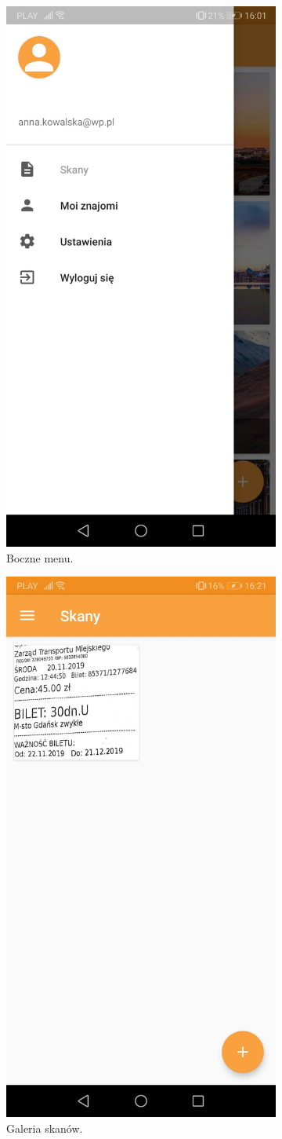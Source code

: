 \documentclass[10pt,twoside,a4paper]{report}
\begin{document}
\begin{figure}[h]
\begin{subfigure}{0.5\textwidth}
\centering
\includegraphics[width=0.9\linewidth, width=5cm]{sideBar}
\caption{Boczne menu.}
\label{fig:sideBar}
\end{subfigure}
\begin{subfigure}{0.5\textwidth}
\centering
\includegraphics[width=0.9\linewidth, width=5cm]{scans}
\caption{Galeria skanów.}
\label{fig:scans}
\end{subfigure}
\begin{subfigure}{0.5\textwidth}
\centering

\end{subfigure}
\end{figure}
\end{document}
